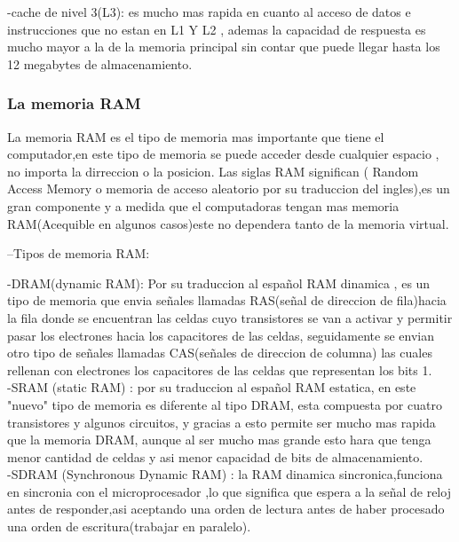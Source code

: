 \documentclass{article}
\begin{document}
           
            -cache de nivel 3(L3): es mucho mas rapida en cuanto al acceso de datos e instrucciones que no estan en L1 Y L2 , ademas la capacidad de respuesta es mucho mayor a la de la memoria principal sin contar que puede llegar hasta los 12 megabytes de almacenamiento.\\
        
        \subsubsection{La memoria RAM}
        La memoria RAM es el tipo de memoria mas importante que tiene el computador,en este tipo de memoria se puede acceder desde cualquier espacio , no importa la dirreccion o la posicion. Las siglas RAM significan ( Random Access Memory o memoria de acceso aleatorio por su traduccion del ingles),es un gran componente y a medida que el computadoras tengan mas memoria RAM(Acequible en algunos casos)este no dependera tanto de la memoria virtual.
        
        --Tipos de memoria RAM:
            
            -DRAM(dynamic RAM): Por su traduccion al español RAM dinamica , es un tipo de memoria que envia señales llamadas RAS(señal de direccion de fila)hacia la fila donde se encuentran las celdas cuyo transistores se van a activar y permitir  pasar los electrones hacia los capacitores de las celdas, seguidamente se envian otro tipo de señales llamadas CAS(señales de direccion de columna) las cuales  rellenan con electrones los capacitores de las celdas que representan los bits 1.\cite{hardzone}\\
            
            -SRAM (static RAM) : por su traduccion al español RAM estatica, en este "nuevo" tipo de memoria es diferente al tipo DRAM, esta compuesta por cuatro transistores y algunos circuitos, y gracias a esto permite ser mucho mas rapida que la memoria DRAM, aunque al ser mucho mas grande esto hara que tenga menor cantidad de celdas y asi menor capacidad de bits de almacenamiento.\cite{hardzone}\\
            
            -SDRAM (Synchronous Dynamic RAM) : la RAM dinamica sincronica,funciona en sincronia con el microprocesador ,lo que significa que espera a la señal de reloj antes de responder,asi aceptando una orden de lectura antes  de haber procesado una orden de escritura(trabajar en paralelo).\cite{hardzone}\\
            
\end{document}
